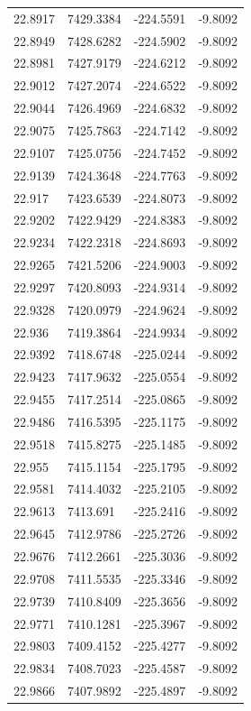 \begin{table}[H]
\begin{tabular}{llll}
22.8917 & 7429.3384 & -224.5591 & -9.8092 \\
22.8949 & 7428.6282 & -224.5902 & -9.8092 \\
22.8981 & 7427.9179 & -224.6212 & -9.8092 \\
22.9012 & 7427.2074 & -224.6522 & -9.8092 \\
22.9044 & 7426.4969 & -224.6832 & -9.8092 \\
22.9075 & 7425.7863 & -224.7142 & -9.8092 \\
22.9107 & 7425.0756 & -224.7452 & -9.8092 \\
22.9139 & 7424.3648 & -224.7763 & -9.8092 \\
22.917 & 7423.6539 & -224.8073 & -9.8092 \\
22.9202 & 7422.9429 & -224.8383 & -9.8092 \\
22.9234 & 7422.2318 & -224.8693 & -9.8092 \\
22.9265 & 7421.5206 & -224.9003 & -9.8092 \\
22.9297 & 7420.8093 & -224.9314 & -9.8092 \\
22.9328 & 7420.0979 & -224.9624 & -9.8092 \\
22.936 & 7419.3864 & -224.9934 & -9.8092 \\
22.9392 & 7418.6748 & -225.0244 & -9.8092 \\
22.9423 & 7417.9632 & -225.0554 & -9.8092 \\
22.9455 & 7417.2514 & -225.0865 & -9.8092 \\
22.9486 & 7416.5395 & -225.1175 & -9.8092 \\
22.9518 & 7415.8275 & -225.1485 & -9.8092 \\
22.955 & 7415.1154 & -225.1795 & -9.8092 \\
22.9581 & 7414.4032 & -225.2105 & -9.8092 \\
22.9613 & 7413.691 & -225.2416 & -9.8092 \\
22.9645 & 7412.9786 & -225.2726 & -9.8092 \\
22.9676 & 7412.2661 & -225.3036 & -9.8092 \\
22.9708 & 7411.5535 & -225.3346 & -9.8092 \\
22.9739 & 7410.8409 & -225.3656 & -9.8092 \\
22.9771 & 7410.1281 & -225.3967 & -9.8092 \\
22.9803 & 7409.4152 & -225.4277 & -9.8092 \\
22.9834 & 7408.7023 & -225.4587 & -9.8092 \\
22.9866 & 7407.9892 & -225.4897 & -9.8092 \\

\end{tabular}
\end{table}
